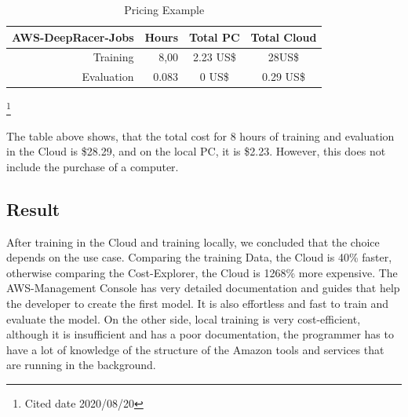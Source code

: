 \begin{table}[H]
\caption{Pricing Example}
\label{tab:services}
\centering
\setlength{\tabcolsep}{5mm}
\def\arraystretch{1.25}
\begin{tabular}{|r|r|c|c|}
\hline
\textbf{AWS-DeepRacer-Jobs} & \textbf{Hours} & \textbf{Total PC} & \textbf{Total Cloud} \\
\hline\hline
Training & 8,00 & 2.23 US\$ & 28US\$ \\
\hline
Evaluation & 0.083 & 0 US\$ & 0.29 US\$ \\
\hline
\end{tabular}
\end{table}
\footnote{Cited date 2020/08/20}

The table above shows, that the total cost for 8 hours of training and evaluation in the Cloud is \$28.29, and on the local PC, it is \$2.23. However, this does not include the purchase of a computer.

\subsection{Result}
After training in the Cloud and training locally, we concluded that the choice depends on the use case. Comparing the training Data, the Cloud is 40\% faster, otherwise comparing the Cost-Explorer, the Cloud is 1268\% more expensive. The AWS-Management Console has very detailed documentation and guides that help the developer to create the first model. It is also effortless and fast to train and evaluate the model. On the other side, local training is very cost-efficient, although it is insufficient and has a poor documentation, the programmer has to have a lot of knowledge of the structure of the Amazon tools and services that are running in the background. 

